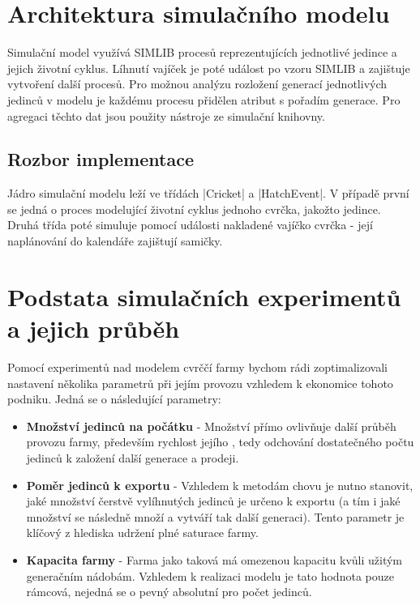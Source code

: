 \documentclass[11pt, a4paper, titlepage]{article}
\makeatletter
\newcommand\ic[1][green]{%
\@testopt{\@ic{#1}}{-#1}%
}
\def\@ic#1[#2]{%
\Collectverb{\@@ic{#1}{#2}}%
}
\def\@@ic#1#2#3{%
{\lstinline[basicstyle=\ttfamily\color{codeprimary},breaklines=true]|#3|}%
}
\makeatother
\begin{document}
    \section{Architektura simulačního modelu}

    Simulační model využívá SIMLIB procesů reprezentujících jednotlivé jedince a jejich životní cyklus. Líhnutí vajíček
    je poté událost po vzoru SIMLIB a zajištuje vytvoření další procesů. Pro možnou analýzu rozložení generací
    jednotlivých jedinců v modelu je každému procesu přidělen atribut s pořadím generace. Pro agregaci těchto dat jsou
    použity nástroje ze simulační knihovny.

    \subsection{Rozbor implementace}

    Jádro simulační modelu leží ve třídách \ic|Cricket| a \ic|HatchEvent|. V případě první se jedná o proces modelující
    životní cyklus jednoho cvrčka, jakožto jedince. Druhá třída poté simuluje pomocí události nakladené vajíčko cvrčka -
    její naplánování do kalendáře zajištují samičky.

    \section{Podstata simulačních experimentů a jejich průběh}

    Pomocí experimentů nad modelem cvrččí farmy bychom rádi zoptimalizovali nastavení několika parametrů při jejím provozu
    vzhledem k ekonomice tohoto podniku. Jedná se o následující parametry:

    \begin{itemize}
        \item \textbf{Množství jedinců na počátku} - Množství přímo ovlivňuje další průběh provozu farmy, především rychlost
        jejího , tedy odchování dostatečného počtu jedinců k založení další generace a prodeji.

        \item \textbf{Poměr jedinců k exportu} - Vzhledem k metodám chovu je nutno stanovit, jaké množství čerstvě
        vylíhnutých jedinců je určeno k exportu (a tím i jaké množství se následně množí a vytváří tak další generaci).
        Tento parametr je klíčový z hlediska udržení plné saturace farmy.

        \item \textbf{Kapacita farmy} - Farma jako taková má omezenou kapacitu kvůli užitým generačním nádobám. Vzhledem
        k realizaci modelu je tato hodnota pouze rámcová, nejedná se o pevný absolutní  pro počet jedinců.
    \end{itemize}
\end{document}
